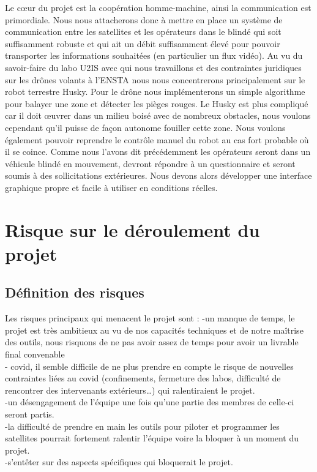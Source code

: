 \documentclass[11pt]{article}
\begin{document}
Le cœur du projet est la coopération homme-machine, ainsi la communication est primordiale. Nous nous attacherons donc à mettre en place un système de communication entre les satellites et les opérateurs dans le blindé qui soit suffisamment robuste et qui ait un débit suffisamment élevé pour pouvoir transporter les informations souhaitées (en particulier un flux vidéo).
Au vu du savoir-faire du labo U2IS avec qui nous travaillons et des contraintes juridiques sur les drônes volants à l’ENSTA nous nous concentrerons principalement sur le robot terrestre Husky. Pour le drône nous implémenterons un simple algorithme pour balayer une zone et détecter les pièges rouges. 
Le Husky est plus compliqué car il doit œuvrer dans un milieu boisé avec de nombreux obstacles, nous voulons cependant qu’il puisse de façon autonome fouiller cette zone. Nous voulons également pouvoir reprendre le contrôle manuel du robot au cas fort probable où il se coince. 
Comme nous l’avons dit précédemment les opérateurs seront dans un véhicule blindé en mouvement, devront répondre à un questionnaire et seront soumis à des sollicitations extérieures. Nous devons alors développer une interface graphique propre et facile à utiliser en conditions réelles.

\section{Risque sur le déroulement du projet }

\subsection{Définition des risques}

Les risques principaux qui menacent le projet sont :
-un manque de temps, le projet est très ambitieux au vu de nos capacités techniques et de notre maîtrise des outils, nous risquons de ne pas avoir assez de temps pour avoir un livrable final convenable\\
- covid, il semble difficile de ne plus prendre en compte le risque de nouvelles contraintes liées au covid (confinements, fermeture des labos, difficulté de rencontrer des intervenants extérieurs…) qui ralentiraient le projet.\\
-un désengagement de l’équipe une fois qu’une partie des membres de celle-ci seront partis. \\
-la difficulté de prendre en main les outils pour piloter et programmer les satellites pourrait fortement ralentir l’équipe voire la bloquer à un moment du projet. \\
-s'entêter sur des aspects spécifiques qui bloquerait le projet. \\
\end{document}
